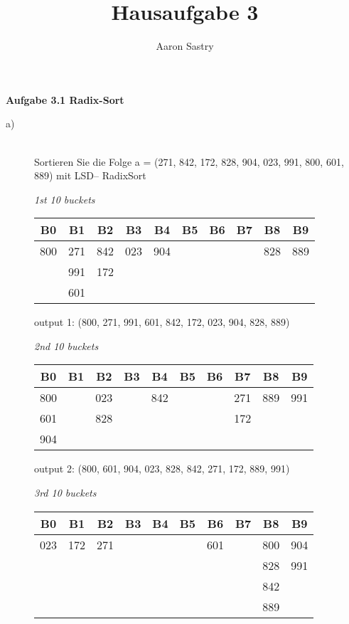 \documentclass[12pt, a4paper, twoside]{article}
\title{Hausaufgabe 3}
\author{Aaron Sastry}
\begin{document}
	
	\maketitle
	
	\textbf{Aufgabe 3.1 Radix-Sort}
	\begin{description}
	
	\item [a)] \hfill \\
	Sortieren Sie die Folge a = (271, 842, 172, 828, 904, 023, 991, 800, 601, 889) mit LSD–
	RadixSort
	
	\emph{1st 10 buckets}
	\begin{tabular}{| c| c| c| c| c| c| c| c| c| c|}
		
		\hline
		B0 & B1 & B2 & B3 & B4 & B5 & B6 & B7 & B8 & B9 \\
		\hline\hline
		
		800 & 271 & 842 & 023 & 904 & & & & 828 & 889  \\
		    & 991 & 172 & & & & & & &  \\
		    & 601 & & & & & & & & \\ 
		\hline
	\end{tabular}

	output 1: (800, 271, 991, 601, 842, 172, 023, 904, 828, 889)
	\newline
	
	\emph{2nd 10 buckets}
	\begin{tabular}{| c| c| c| c| c| c| c| c| c| c|}
		
		\hline
		B0 & B1 & B2 & B3 & B4 & B5 & B6 & B7 & B8 & B9 \\
		\hline\hline
		
		800 & & 023 & & 842 & & & 271 & 889 & 991 \\
		601 & & 828 & &     & & & 172 & & \\
		904 & & & &     & & &     & & \\
		\hline
	\end{tabular}
	
	output 2: (800, 601, 904, 023, 828, 842, 271, 172, 889, 991)
	\newline
	
	\emph{3rd 10 buckets}
	\begin{tabular}{| c| c| c| c| c| c| c| c| c| c|}
		
		\hline
		B0 & B1 & B2 & B3 & B4 & B5 & B6 & B7 & B8 & B9 \\
		\hline\hline
		
		023 & 172 & 271 & & & & 601 & & 800 & 904 \\
		    &     &     & & & &     & & 828 & 991 \\
		    &     &     & & & &     & & 842 &     \\
		    &     &     & & & &     & & 889 &     \\
		

\end{tabular}
\end{description}
\end{document}
